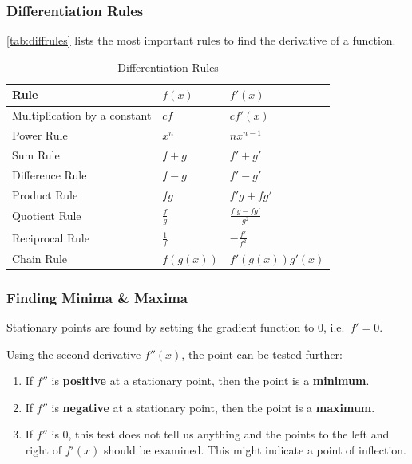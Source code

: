 \subsubsection{Differentiation Rules} %
\autoref{tab:diffrules} lists the most important rules to find the derivative of a function.
\begin{table}[ht]
	\caption{Differentiation Rules}\label{tab:diffrules}
	\centering
	\renewcommand{\arraystretch}{2}
	\begin{tabular}{m{}m{}m{}}
		\toprule


		Rule                         & \(f(x)\)        & \(f'(x)\)                 \\ \midrule
		Multiplication by a constant & \(cf\)          & \(cf'(x)\)                \\
		Power Rule                   & \( x^n \)       & \(nx^{n-1}\)              \\
		Sum Rule                     & \(f + g\)       & \( f' + g'\)              \\
		Difference Rule              & \(f - g\)       & \( f' - g'\)              \\
		Product Rule                 & \(fg\)          & \(f'g + fg'\)             \\
		Quotient Rule                & \(\frac{f}{g}\) & \(\frac{f'g - fg'}{g^2}\) \\
		Reciprocal Rule              & \(\frac{1}{f}\) & \(-\frac{f'}{f^2}\)       \\
		Chain Rule                   & \(f(g(x))\)     & \(f'(g(x))g'(x)\)         \\ \bottomrule
	\end{tabular}

\end{table}

\subsubsection{Finding Minima \& Maxima}
Stationary points are found by setting the gradient function to 0, i.e.\  \(f' = 0\).

Using the second derivative \(f''(x)\), the point can be tested further:

\begin{enumerate}
	\item If \(f''\) is \textbf{positive} at a stationary point, then the point is a \textbf{minimum}.
	\item If \(f''\) is \textbf{negative} at a stationary point, then the point is a \textbf{maximum}.
	\item If \(f''\) is 0, this test does not tell us anything and the points to the left and right of \( f'(x) \) should be examined. This might indicate a point of inflection.
\end{enumerate}


